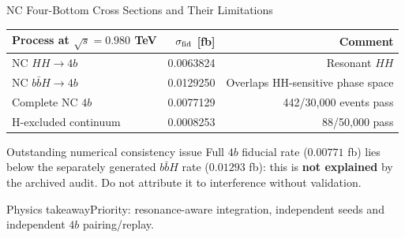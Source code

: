 \documentclass[aspectratio=1610,english]{beamer}
\newcommand{\src}[1]{\vfill{\par\color{black!65}\fontsize{6.4}{7.4}\selectfont\emph{Source:} #1\par}}
\newcommand{\key}[1]{\begin{alertblock}{Physics takeaway}\scriptsize #1\end{alertblock}}
\begin{document}
\begin{frame}[t]{NC Four-Bottom Cross Sections and Their Limitations}
\small

\begin{center}\setlength{\tabcolsep}{7pt}
\begin{tabular}{lrr}\toprule
Process at $\sqrt{s}=0.980$ TeV & $\sigma_{\rm fid}$ [fb] & Comment\\\midrule
NC $HH\to4b$ & 0.0063824 & Resonant $HH$\\
NC $b\bar bH\to4b$ & 0.0129250 & Overlaps HH-sensitive phase space\\
Complete NC $4b$ & 0.0077129 & 442/30,000 events pass\\
H-excluded continuum & 0.0008253 & 88/50,000 pass\\\bottomrule
\end{tabular}\end{center}
\begin{alertblock}{Outstanding numerical consistency issue}
Full $4b$ fiducial rate ($0.00771$ fb) lies below the separately generated $b\bar bH$ rate ($0.01293$ fb): this is \textbf{not explained} by the archived audit. Do not attribute it to interference without validation.
\end{alertblock}
\key{Priority: resonance-aware integration, independent seeds and independent $4b$ pairing/replay.}

\end{frame}
\end{document}
